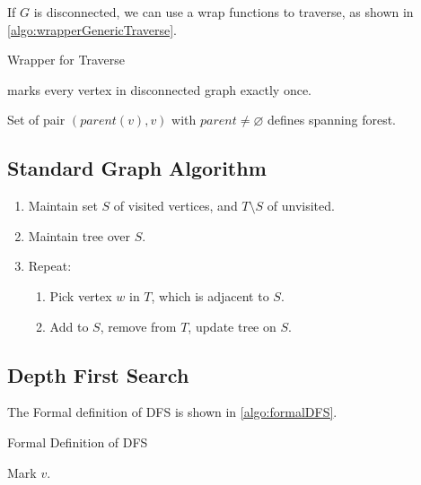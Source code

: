 If $G$ is disconnected, we can use a wrap functions to traverse,
as shown in \cref{algo:wrapperGenericTraverse}.

\begin{algorithm}[H]
    \caption{Wrapper for Traverse}\label{algo:wrapperGenericTraverse}
    \begin{algorithmic}[1]
                    \State{}
                \EndIf
            \EndFor
        \EndProcedure
    \end{algorithmic}
\end{algorithm}

\begin{lemma}
     marks every vertex in disconnected graph exactly once.

    Set of pair $(parent(v),v)$ with $parent \neq \varnothing$ defines spanning forest.
\end{lemma}

\subsection{Standard Graph Algorithm}
\begin{enumerate}[label=Step {\arabic*}, leftmargin=0.5in]
    \item Maintain set $S$ of visited vertices, and $T \setminus S$ of unvisited.
    \item Maintain tree over $S$.
    \item Repeat:
        \begin{enumerate}
            \item Pick vertex $w$ in $T$, which is adjacent to $S$.
            \item Add to $S$, remove from $T$, update tree on $S$.
        \end{enumerate}
\end{enumerate}

\subsection{Depth First Search}
The Formal definition of DFS is shown in \cref{algo:formalDFS}.
\begin{algorithm}[H]
    \caption{Formal Definition of DFS}\label{algo:formalDFS}
    \begin{algorithmic}[1]
            \State Mark $v$.
                    \State{}
                \EndIf
            \EndFor
        \EndProcedure
    \end{algorithmic}
\end{algorithm}

